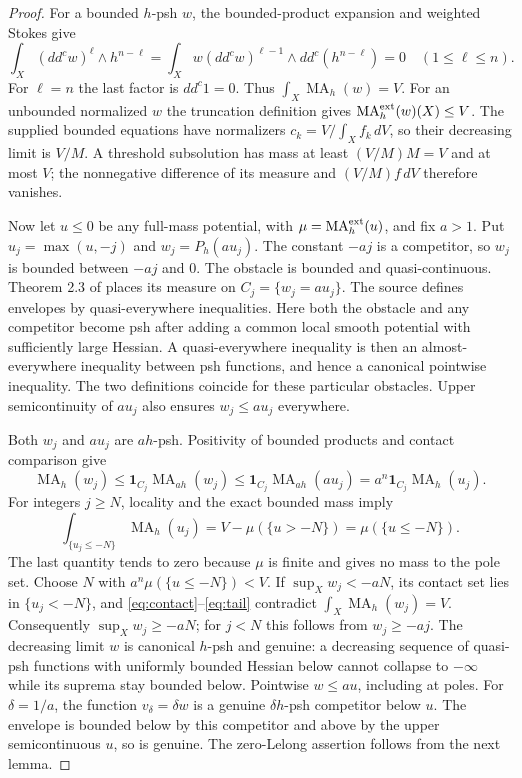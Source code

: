 \documentclass[11pt]{article}
\newcommand{\ddc}{dd^c}
\newcommand{\MA}{\operatorname{MA}}
\newcommand{\1}{\mathbf 1}
\theoremstyle{remark}\newtheorem{remark}[theorem]{Remark}
\begin{document}
\begin{proof}
For a bounded $h$-psh $w$, the bounded-product expansion and weighted Stokes give
\[
 \int_X(\ddc w)^\ell\wedge h^{n-\ell}
 =\int_Xw(\ddc w)^{\ell-1}\wedge\ddc(h^{n-\ell})=0
 \quad(1\leq\ell\leq n).
\]
For $\ell=n$ the last factor is $\ddc1=0$.
Thus $\int_X\MA_h(w)=V$. For an unbounded normalized $w$ the truncation
definition gives $\MA_h^{\rm ext}(w)(X)\leq V$.
The supplied bounded equations have normalizers
$c_k=V/\int_Xf_k\,dV$, so their decreasing limit is $V/M$.
A threshold subsolution has mass at least $(V/M)M=V$ and at most $V$;
the nonnegative difference of its measure and $(V/M)f\,dV$ therefore vanishes.

Now let $u\leq0$ be any full-mass potential, with
$\mu=\MA_h^{\rm ext}(u)$, and fix $a>1$.
Put $u_j=\max(u,-j)$ and $w_j=P_h(au_j)$.
The constant $-aj$ is a competitor, so $w_j$ is bounded between $-aj$ and $0$.
The obstacle is bounded and quasi-continuous. Theorem 2.3 of \cite{GL}
places its measure on $C_j=\{w_j=au_j\}$.
The source defines envelopes by quasi-everywhere inequalities. Here both
the obstacle and any competitor become psh after adding a common local
smooth potential with sufficiently large Hessian. A quasi-everywhere
inequality is then an almost-everywhere inequality between psh functions,
and hence a canonical pointwise inequality. The two definitions coincide
for these particular obstacles. Upper semicontinuity of $au_j$ also ensures
$w_j\leq au_j$ everywhere.

Both $w_j$ and $au_j$ are $ah$-psh. Positivity of bounded products and
contact comparison \cite[Lemma 1.2]{GL} give
\begin{equation}\label{eq:contact}
 \MA_h(w_j)
 \leq\1_{C_j}\MA_{ah}(w_j)
 \leq\1_{C_j}\MA_{ah}(au_j)
 =a^n\1_{C_j}\MA_h(u_j).
\end{equation}
For integers $j\geq N$, locality and the exact bounded mass imply
\begin{equation}\label{eq:tail}
 \int_{\{u_j\leq-N\}}\MA_h(u_j)
 =V-\mu(\{u>-N\})=\mu(\{u\leq-N\}).
\end{equation}
The last quantity tends to zero because $\mu$ is finite and gives no mass
to the pole set. Choose $N$ with $a^n\mu(\{u\leq-N\})<V$.
If $\sup_Xw_j<-aN$, its contact set lies in $\{u_j<-N\}$, and
\eqref{eq:contact}--\eqref{eq:tail} contradict $\int_X\MA_h(w_j)=V$.
Consequently $\sup_Xw_j\geq-aN$; for $j<N$ this follows from $w_j\geq-aj$.
The decreasing limit $w$ is canonical $h$-psh and genuine: a decreasing
sequence of quasi-psh functions with uniformly bounded Hessian below cannot
collapse to $-\infty$ while its suprema stay bounded below.
Pointwise $w\leq au$, including at poles.
For $\delta=1/a$, the function $v_\delta=\delta w$ is a genuine
$\delta h$-psh competitor below $u$. The envelope is bounded below by this
competitor and above by the upper semicontinuous $u$, so is genuine.
The zero-Lelong assertion follows from the next lemma.
\end{proof}
\end{document}
